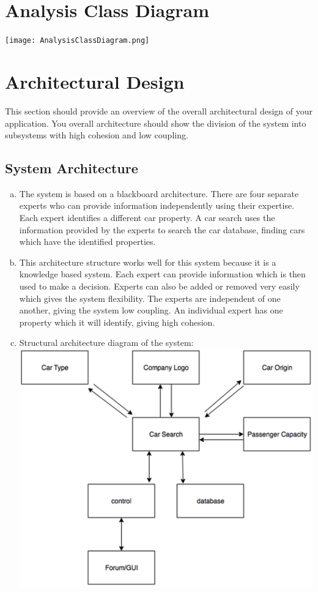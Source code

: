 \documentclass[12pt]{article}
\begin{document}
\section{Analysis Class Diagram}
\label{sec:analysis_class_diagram}
\texttt{[image: AnalysisClassDiagram.png]}


\section{Architectural Design}
\label{sec:architectural_design}
This section should provide an overview of the overall architectural design of your application. You overall architecture should show the division of the system into subsystems with high cohesion and low coupling.

\subsection{System Architecture}
\label{sub:system_architecture}
\begin{enumerate}[a)]
	\item The system is based on a blackboard architecture. There are four separate experts who can provide information independently using their expertise. Each expert identifies a different car property. A car search uses the information provided by the experts to search the car database, finding cars which have the identified properties.
	\item This architecture structure works well for this system because it is a knowledge based system. Each expert can provide information which is then used to make a decision. Experts can also be added or removed very easily which gives the system flexibility. The experts are independent of one another, giving the system low coupling. An individual expert has one property which it will identify, giving high cohesion.
	\item Structural architecture diagram of the system:\\
	\includegraphics[scale=0.8]{Structural.png}
\end{enumerate}
\end{document}
